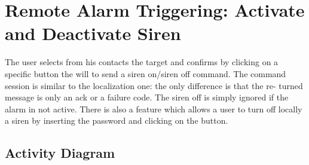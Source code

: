 \section{Remote Alarm Triggering: Activate and Deactivate Siren}

The user selects from his contacts the target and confirms by clicking on a
specific button the will to send a siren on/siren off command. The command
session is similar to the localization one: the only difference is that the re-
turned message is only an ack or a failure code. The siren off is simply ignored
if the alarm in not active. There is also a feature which allows a user to turn
off locally a siren by inserting the password and clicking on the button.

\newpage
\subsection{Activity Diagram}

